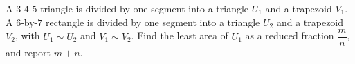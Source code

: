 A $3$-$4$-$5$ triangle is divided by one segment into a triangle $U_1$ and a trapezoid $V_1$. A $6$-by-$7$ rectangle is divided by one segment into a triangle $U_2$ and a trapezoid $V_2$, with $U_1\sim U_2$ and $V_1\sim V_2$. Find the least area of $U_1$ as a reduced fraction $\dfrac{m}{n}$, and report $m+n$.
